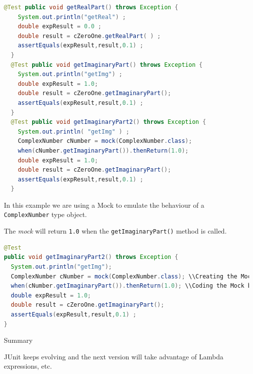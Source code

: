 \documentclass[11pt, xcolor=svgnames]{beamer}
\begin{document}
\begin{frame}[fragile]

\begin{lstlisting}[language=JAVA,basicstyle=\scriptsize]
  @Test public void getRealPart() throws Exception {
    System.out.println("getReal") ;
    double expResult = 0.0 ;
    double result = cZeroOne.getRealPart( ) ;
    assertEquals(expResult,result,0.1) ;
  }
  @Test public void getImaginaryPart() throws Exception {
    System.out.println("getImg") ;
    double expResult = 1.0;
    double result = cZeroOne.getImaginaryPart();
    assertEquals(expResult,result,0.1) ;
  }
  @Test public void getImaginaryPart2() throws Exception {
    System.out.println( "getImg" ) ;
    ComplexNumber cNumber = mock(ComplexNumber.class);
    when(cNumber.getImaginaryPart()).thenReturn(1.0);
    double expResult = 1.0;
    double result = cZeroOne.getImaginaryPart();
    assertEquals(expResult,result,0.1) ;
  }
\end{lstlisting}

\end{frame}



\begin{frame}[fragile]

In this example we are using a Mock to emulate the behaviour of a \texttt{ComplexNumber} type object.

The \emph{mock} will return  \texttt{1.0} when the \texttt{getImaginaryPart()} method is called.

\begin{lstlisting}[language=JAVA,basicstyle=\scriptsize]
@Test
public void getImaginaryPart2() throws Exception {
  System.out.println("getImg");
  ComplexNumber cNumber = mock(ComplexNumber.class); \\Creating the Mock.
  when(cNumber.getImaginaryPart()).thenReturn(1.0); \\Coding the Mock behaviour.
  double expResult = 1.0;
  double result = cZeroOne.getImaginaryPart();
  assertEquals(expResult,result,0.1) ;
}
\end{lstlisting}

\end{frame}



\begin{frame}[fragile]{Summary}

JUnit keeps evolving and the next version will take advantage of Lambda expressions, etc.


\end{frame}


\end{document}
